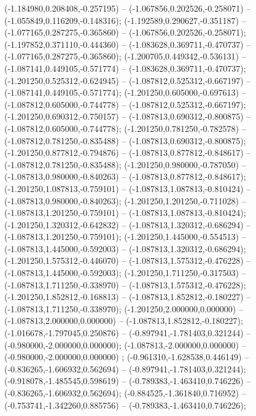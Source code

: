 (-1.184980,0.208408,-0.257195) -- (-1.067856,0.202526,-0.258071) -- (-1.055849,0.116209,-0.148316);
 (-1.192589,0.290627,-0.351187) -- (-1.077165,0.287275,-0.365860) -- (-1.067856,0.202526,-0.258071);
 (-1.197852,0.371110,-0.444360) -- (-1.083628,0.369711,-0.470737) -- (-1.077165,0.287275,-0.365860);
 (-1.200705,0.449342,-0.536131) -- (-1.087141,0.449105,-0.571774) -- (-1.083628,0.369711,-0.470737);
 (-1.201250,0.525312,-0.624945) -- (-1.087812,0.525312,-0.667197) -- (-1.087141,0.449105,-0.571774);
 (-1.201250,0.605000,-0.697613) -- (-1.087812,0.605000,-0.744778) -- (-1.087812,0.525312,-0.667197);
 (-1.201250,0.690312,-0.750157) -- (-1.087813,0.690312,-0.800875) -- (-1.087812,0.605000,-0.744778);
 (-1.201250,0.781250,-0.782578) -- (-1.087812,0.781250,-0.835488) -- (-1.087813,0.690312,-0.800875);
 (-1.201250,0.877812,-0.794876) -- (-1.087813,0.877812,-0.848617) -- (-1.087812,0.781250,-0.835488);
 (-1.201250,0.980000,-0.787050) -- (-1.087813,0.980000,-0.840263) -- (-1.087813,0.877812,-0.848617);
 (-1.201250,1.087813,-0.759101) -- (-1.087813,1.087813,-0.810424) -- (-1.087813,0.980000,-0.840263);
 (-1.201250,1.201250,-0.711028) -- (-1.087813,1.201250,-0.759101) -- (-1.087813,1.087813,-0.810424);
 (-1.201250,1.320312,-0.642832) -- (-1.087813,1.320312,-0.686294) -- (-1.087813,1.201250,-0.759101);
 (-1.201250,1.445000,-0.554513) -- (-1.087813,1.445000,-0.592003) -- (-1.087813,1.320312,-0.686294);
 (-1.201250,1.575312,-0.446070) -- (-1.087813,1.575312,-0.476228) -- (-1.087813,1.445000,-0.592003);
 (-1.201250,1.711250,-0.317503) -- (-1.087813,1.711250,-0.338970) -- (-1.087813,1.575312,-0.476228);
 (-1.201250,1.852812,-0.168813) -- (-1.087813,1.852812,-0.180227) -- (-1.087813,1.711250,-0.338970);
 (-1.201250,2.000000,0.000000) -- (-1.087813,2.000000,0.000000) -- (-1.087813,1.852812,-0.180227);
 (-1.016678,-1.797045,0.250876) -- (-0.897941,-1.781403,0.321244) -- (-0.980000,-2.000000,0.000000);
 (-1.087813,-2.000000,0.000000) -- (-0.980000,-2.000000,0.000000) ;
 (-0.961310,-1.628538,0.446149) -- (-0.836265,-1.606932,0.562694) -- (-0.897941,-1.781403,0.321244);
 (-0.918078,-1.485545,0.598619) -- (-0.789383,-1.463410,0.746226) -- (-0.836265,-1.606932,0.562694);
 (-0.884525,-1.361840,0.716952) -- (-0.753741,-1.342260,0.885756) -- (-0.789383,-1.463410,0.746226);
